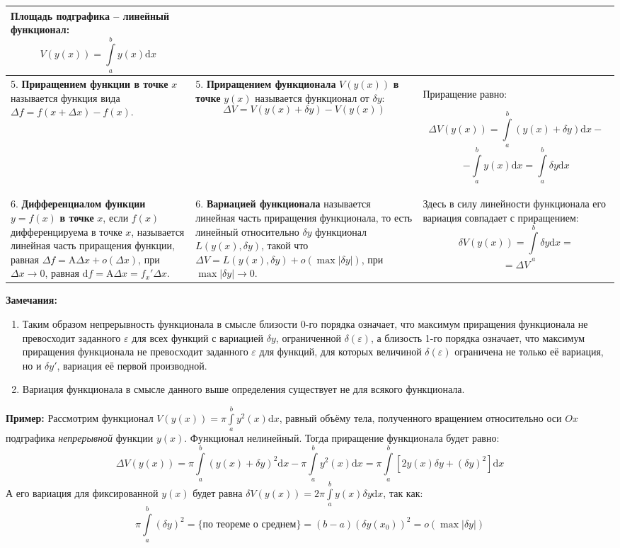 \documentclass[12pt, a4paper]{article}
\newcommand{\di}{\mathrm{d}}
\begin{document}
\begin{footnotesize}
\begin{center}
\begin{tabular}{|p{40mm}|p{76mm}|p{35mm}|}
Площадь подграфика -- линейный функционал: \[V(y(x)) = \int \limits_a^b y(x) \di x \] \\ \hline
5. \textbf{Приращением функции в точке} $x$ называется функция вида $\Delta f = f(x+\Delta x) - f(x)$. &
5. \textbf{Приращением функционала} $V(y(x))$ \textbf{в точке} $y(x)$ называется функционал от $\delta y$: \[\Delta V = V(y(x) + \delta y) - V(y(x)) \] &
Приращение равно: \begin{tiny} \[\Delta V(y(x)) = \int \limits_a^b (y(x) + \delta y) \di x - \] \[- \int \limits_a^b y(x) \di x = \int \limits_a^b \delta y \di x \] \end{tiny} \\ \hline
6. \textbf{Дифференциалом функции} $y=f(x)$ \textbf{в точке} $x$, если $f(x)$ дифференцируема в точке $x$, называется линейная часть приращения функции, равная $\Delta f = \mathrm{A} \Delta x + o(\Delta x)$, при $\Delta x \to 0$, равная $\di f = \mathrm{A} \Delta x = f_x' \Delta x$. &
6. \textbf{Вариацией функционала} называется линейная часть приращения функционала, то есть линейный относительно $\delta y$ функционал $L(y(x), \delta y)$, такой что $\Delta V = L(y(x), \delta y) + o(\max |\delta y|)$, при $\max |\delta y| \to 0$. &
Здесь в силу линейности функционала его вариация совпадает с приращением: \[\delta V(y(x)) = \int \limits_a^b \delta y \di x = \] \[= \Delta V \] \\ \hline
\end{tabular}
\end{center}
\end{footnotesize}

\newpage\restoregeometry

\textbf{Замечания:}
\begin{enumerate}
 \item Таким образом непрерывность функционала в смысле близости 0-го порядка означает, что максимум приращения функционала не превосходит заданного $\varepsilon$ для всех функций с вариацией $\delta y$, ограниченной $\delta(\varepsilon)$, а близость 1-го порядка означает, что максимум приращения функционала не превосходит заданного $\varepsilon$ для функций, для которых величиной $\delta(\varepsilon)$ ограничена не только её вариация, но и $\delta y'$, вариация её первой производной.\
 \item Вариация функционала в смысле данного выше определения существует не для всякого функционала.
\end{enumerate}

\textbf{Пример:} Рассмотрим функционал $V(y(x)) = \pi \int \limits_a^b y^2 (x) \di x$, равный объёму тела, полученного вращением относительно оси $Ox$ подграфика \textit{непрерывной} функции $y(x)$. Функционал нелинейный. Тогда приращение функционала будет равно:
\[\Delta V(y(x)) = \pi \int \limits_a^b (y(x) + \delta y)^2 \di x - \pi \int \limits_a^b y^2(x) \di x = \pi \int \limits_a^b \left[ 2y(x) \delta y + (\delta y)^2 \right] \di x \]
А его вариация для фиксированной $y(x)$ будет равна $\delta V(y(x)) = 2\pi \int \limits_a^b y(x) \delta y \di x$, так как:
\[\pi \int \limits_a^b (\delta y)^2 = \{ \textrm{по теореме о среднем} \} = (b-a)(\delta y(x_0))^2 = o(\max |\delta y|) \]
\end{document}
